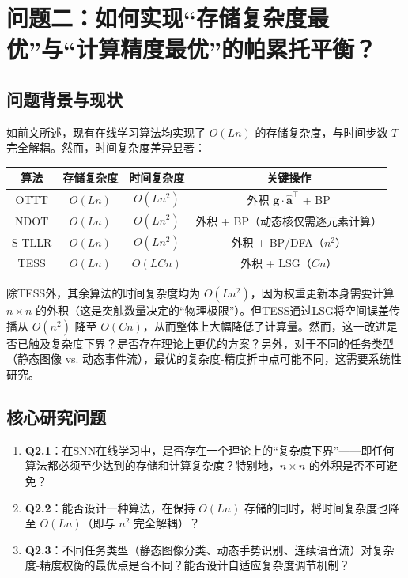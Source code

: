 \documentclass{article}
\begin{document}
\section{问题二：如何实现“存储复杂度最优”与“计算精度最优”的帕累托平衡？}

\subsection{问题背景与现状}

如前文所述，现有在线学习算法均实现了 \(O(Ln)\) 的存储复杂度，与时间步数 \(T\) 完全解耦。然而，时间复杂度差异显著：

\begin{center}
\begin{tabular}{|c|c|c|c|}
\hline
算法 & 存储复杂度 & 时间复杂度 & 关键操作 \\
\hline
OTTT & \(O(Ln)\) & \(O(Ln^2)\) & 外积 \(\mathbf{g} \cdot \hat{\mathbf{a}}^\top\) + BP \\
NDOT & \(O(Ln)\) & \(O(Ln^2)\) & 外积 + BP（动态核仅需逐元素计算） \\
S-TLLR & \(O(Ln)\) & \(O(Ln^2)\) & 外积 + BP/DFA（\(n^2\)） \\
TESS & \(O(Ln)\) & \(O(LCn)\) & 外积 + LSG（\(Cn\)） \\
\hline
\end{tabular}
\end{center}

除TESS外，其余算法的时间复杂度均为 \(O(Ln^2)\)，因为权重更新本身需要计算 \(n \times n\) 的外积（这是突触数量决定的“物理极限”）。但TESS通过LSG将空间误差传播从 \(O(n^2)\) 降至 \(O(Cn)\)，从而整体上大幅降低了计算量。然而，这一改进是否已触及复杂度下界？是否存在理论上更优的方案？另外，对于不同的任务类型（静态图像 vs. 动态事件流），最优的复杂度-精度折中点可能不同，这需要系统性研究。

\subsection{核心研究问题}

\begin{enumerate}
    \item \textbf{Q2.1}：在SNN在线学习中，是否存在一个理论上的“复杂度下界”——即任何算法都必须至少达到的存储和计算复杂度？特别地，\(n \times n\) 的外积是否不可避免？
    \item \textbf{Q2.2}：能否设计一种算法，在保持 \(O(Ln)\) 存储的同时，将时间复杂度也降至 \(O(Ln)\)（即与 \(n^2\) 完全解耦）？
    \item \textbf{Q2.3}：不同任务类型（静态图像分类、动态手势识别、连续语音流）对复杂度-精度权衡的最优点是否不同？能否设计自适应复杂度调节机制？
\end{enumerate}
\end{document}
